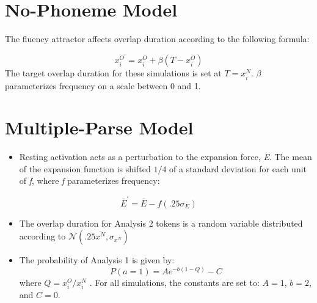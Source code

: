 \section{No-Phoneme Model}
The fluency attractor affects overlap duration according to the following
formula:

\begin{equation}
x_{i}^{O^{\prime}}=x_{i}^{O}+\beta(T-x_{i}^{O})\label{eq:Frequency attractor-1}
\end{equation}
The target overlap duration for these simulations is set at $T=x_{i}^{N}$.
$\beta$ parameterizes frequency on a scale between 0 and 1. 

\section{Multiple-Parse Model}
\begin{itemize}
\item Resting activation acts as a perturbation to the expansion force,
\emph{E}. The mean of the expansion function is shifted ${1}/{4}$
of a standard deviation for each unit of \emph{f}, where \emph{f} parameterizes
frequency:
\end{itemize}
\[
\overline{E}^{\prime}=\overline{E}-f(.25\sigma_{E})
\]

\begin{itemize}
\item The overlap duration for Analysis 2 tokens is a random variable distributed
according to $\mathcal{\mathscr{N}}\left(.25\overline{x^{N}},\sigma_{x^{N}}\right)$
\item The probability of Analysis 1 is given by:
\begin{equation}
P(a=1)=Ae^{-b(1-Q)}-C\label{eq:segmentation-1-1}
\end{equation}
where $Q={x_{i}^{O}}/{x_{i}^{N}}$\emph{ }. For all simulations,
the constants are set to: $A=1$, $b=2$, and $C=0$.
\end{itemize}
